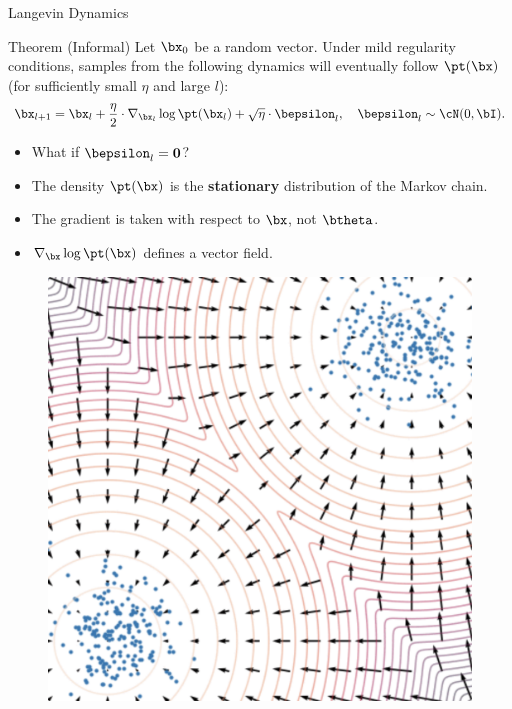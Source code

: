 \documentclass{beamer}
\begin{document}
\begin{frame}{Langevin Dynamics}
	\vspace{-0.4cm}
	\begin{block}{Theorem (Informal)}
		Let $\bx_0$ be a random vector. Under mild regularity conditions, samples from the following dynamics will eventually follow $\pt(\bx)$ (for sufficiently small $\eta$ and large $l$):
		\vspace{-0.3cm}
		\[
			\bx_{l + 1} = \bx_l + \frac{\eta}{2} \cdot \nabla_{\bx_l} \log \pt(\bx_l) + \sqrt{\eta} \cdot \bepsilon_l, \quad \bepsilon_l \sim \cN(0, \bI).
		\]
		\vspace{-0.5cm}
	\end{block}
	\eqpause
	\begin{minipage}{0.55\linewidth}
		\begin{itemize}
			\item What if $\bepsilon_l = \boldsymbol{0}$?
			\item The density $\pt(\bx)$ is the \textbf{stationary} distribution of the Markov chain.
			\item The gradient is taken with respect to $\bx$, not $\btheta$.
			\item $\nabla_{\bx} \log \pt(\bx)$ defines a vector field.
		\end{itemize}
	\end{minipage}%
	\begin{minipage}{0.45\linewidth}
		\begin{figure}
			\centering
			\includegraphics[width=0.9\linewidth]{figs/langevin_dynamic}
		\end{figure}
	\end{minipage}
\end{frame}
\end{document}
